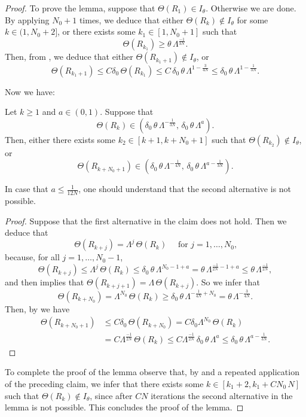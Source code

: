 \begin{proof}
To prove the lemma, suppose that $\Theta(R_1)\in I_\theta$. Otherwise we are done. 
By applying  $N_0+1$ times, we deduce that either
$\Theta(R_{k})\not\in I_\theta$ for some $k\in(1,N_0+2]$, or there exists some $k_1\in[1,N_0+1]$ such that
$$\Theta(R_{k_1})\geq \theta\,\Lambda^{\frac{-1}{3N}}.$$
Then, from , we deduce that either 
$\Theta(R_{k_1 + 1})\not\in I_\theta$, or
\begin{equation}\label{eqk111}
\Theta(R_{k_1+1})\leq C\delta_0\,\Theta(R_{k_1})\leq C\,\delta_0\,\theta\,\Lambda^{1-\frac3{4N}} \leq \delta_0\,\theta\,\Lambda^{1-\frac1{3N}}.
\end{equation}

Now we have:

\begin{claim}
Let $k\geq1$ and $a\in (0,1)$. Suppose that
$$\Theta(R_k) \in (\delta_0\,\theta\,\Lambda^{-\frac1{3N}},\,\delta_0\,\theta\,\Lambda^{a}).$$
Then, either there exists some
$k_2\in [k+1,k+N_0+1]$ such that $\Theta(R_{k_2})\not\in I_\theta$, or 
$$\Theta(R_{k+N_0+1}) \in 
(\delta_0\,\theta\,\Lambda^{-\frac1{4N}},\,\delta_0\,\theta\,\Lambda^{a-\frac1{3N}}).$$
\end{claim}

In  case that $a\leq\frac1{12N}$, one should understand that the second alternative is not possible.

\begin{proof}
Suppose that the first alternative in the claim does not hold.
Then we deduce that
$$\Theta(R_{k+j}) = \Lambda^j\,\Theta(R_k)\quad \mbox{ for $j=1,\ldots,N_0$,}$$
because, for all $j=1,\ldots,N_0-1$,
$$\Theta(R_{k+j}) \leq \Lambda^j\,\Theta(R_k)
\leq \delta_0\,\theta\,\Lambda^{N_0-1+a} = \theta\,\Lambda^{\frac{-1}{2N}-1+a}\leq \theta\,\Lambda^{\frac{-1}{2N}},
$$
and then  implies that $\Theta(R_{k+j+1})=\Lambda\,\Theta(R_{k+j})$.
So we infer that
$$\Theta(R_{k+N_0}) = \Lambda^{N_0}\,\Theta(R_k)\geq\delta_0\,\theta\,\Lambda^{-\frac1{4N} + N_0}
= \theta\,\Lambda^{-\frac3{4N}}.
$$
Then, by  we have
\begin{align*}
\Theta(R_{k+N_0+1})& \leq C\delta_0\,\Theta(R_{k+N_0}) = C\delta_0\Lambda^{N_0}\,\Theta(R_k)\\
&
= C\Lambda^{\frac{-1}{2N}}\,\Theta(R_k)
\leq C\Lambda^{\frac{-1}{2N}}\,\delta_0\,\theta\,\Lambda^{a} \leq \delta_0\,\theta\,\Lambda^{a-\frac1{3N}}.
\end{align*}
\end{proof}
\vv

To complete the proof of the lemma observe that, by  and a repeated application of the preceding claim, we infer that
 there exists some $k\in [k_1+2,k_1+C N_0\,N]$ such that $\Theta(R_{k})\not\in I_\theta$, since after $CN$ iterations the second alternative in the lemma is not possible. This concludes the proof of the lemma.
\end{proof}

